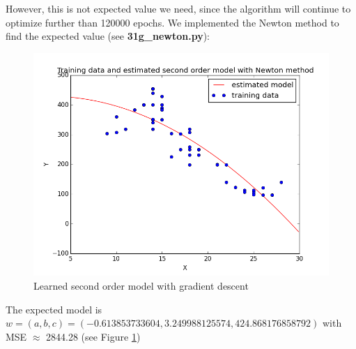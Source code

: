 \documentclass{article}
\begin{document}
However, this is not expected value we need, since the algorithm will continue to optimize further than 120000 epochs. We implemented the Newton method to find the expected value (see \textbf{31g\_newton.py}):
\begin{figure}[H]
	\centering
	\includegraphics[scale=0.4]{31g_newton.png}
	\caption{Learned second order model with gradient descent}
	\label{fig6}
\end{figure}

The expected model is $w = (a, b, c) = (-0.613853733604, 3.249988125574, 424.868176858792)$ with MSE $\approx$ 2844.28 (see Figure \ref{fig6})
\end{document}
